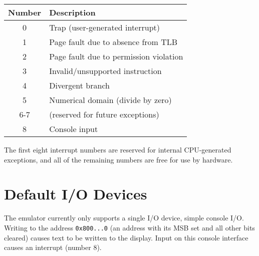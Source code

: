 \documentclass[10pt,letterpaper]{article}
\begin{document}
\begin{center}
\begin{tabular}{cl}
\textbf{Number}&\textbf{Description}\\
\hline
0    &Trap (user-generated interrupt)\\
1    &Page fault due to absence from TLB\\
2    &Page fault due to permission violation\\
3    &Invalid/unsupported instruction\\
4    &Divergent branch\\
5    &Numerical domain (divide by zero)\\
6-7&(reserved for future exceptions)\\
8    &Console input\\
\end{tabular}
\end{center}

The first eight interrupt numbers are reserved for internal CPU-generated exceptions, and all of the remaining numbers are free for use by hardware.





\section{Default I/O Devices}
The emulator currently only supports a single I/O device, simple console I/O.
Writing to the address \texttt{0x800...0} (an address with its MSB set and all other bits cleared) causes text to be written to the display.
Input on this console interface causes an interrupt (number 8).
\end{document}
